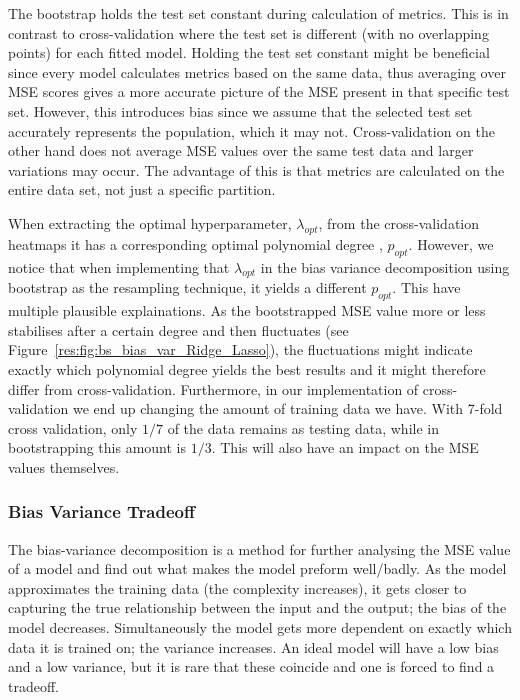 \documentclass[twocolumn,english,notitlepage]{article}
\begin{document}
            The bootstrap holds the test set constant during calculation of metrics. This is in contrast to cross-validation where the test set is different (with no overlapping points) for each fitted model. Holding the test set constant might be beneficial since every model calculates metrics based on the same data, thus averaging over MSE scores gives a more accurate picture of the MSE present in that specific test set. However, this introduces bias since we assume that the selected test set accurately represents the population, which it may not. Cross-validation on the other hand does not average MSE values over the same test data and larger variations may occur. The advantage of this is that metrics are calculated on the entire data set, not just a specific partition.
            
            When extracting the optimal hyperparameter, $\lambda_{opt}$, from the cross-validation heatmaps it has a corresponding optimal polynomial degree , $p_{opt}$. However, we notice that when implementing that $\lambda_{opt}$ in the bias variance decomposition using bootstrap as the resampling technique, it yields a different $p_{opt}$. This have multiple plausible explainations. As the bootstrapped MSE value more or less stabilises after a certain degree and then fluctuates (see Figure~\ref{res:fig:bs_bias_var_Ridge_Lasso}), the fluctuations might indicate exactly which polynomial degree yields the best results and it might therefore differ from cross-validation. Furthermore, in our implementation of cross-validation we end up changing the amount of training data we have. With 7-fold cross validation, only $1/7$ of the data remains as testing data, while in bootstrapping this amount is $1/3$. This will also have an impact on the MSE values themselves.             


        \subsubsection{Bias Variance Tradeoff}
            The bias-variance decomposition is a method for further analysing the MSE value of a model and find out what makes the model preform well/badly. As the model approximates the training data (the complexity increases), it gets closer to capturing the true relationship between the input and the output; the bias of the model decreases. Simultaneously the model gets more dependent on exactly which data it is trained on; the variance increases. An ideal model will have a low bias and a low variance, but it is rare that these coincide and one is forced to find a tradeoff. 
\end{document}
